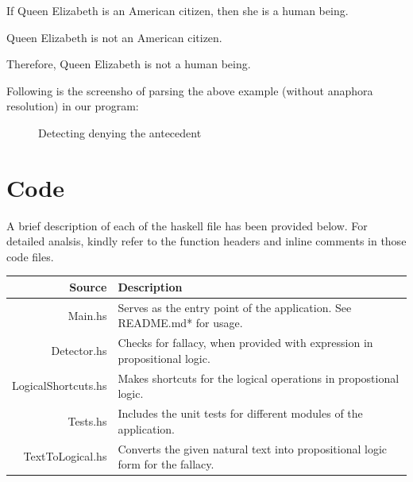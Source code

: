 \documentclass[14pt, english]{article}
\providecommand{\tabularnewline}{\\}
\begin{document}
\begin{center}
If Queen Elizabeth is an American citizen, then she is a human being.
\par\end{center}

\begin{center}
Queen Elizabeth is not an American citizen.
\par\end{center}

\begin{center}
Therefore, Queen Elizabeth is not a human being.
\par\end{center}

Following is the screensho of parsing the above example (without anaphora
resolution) in our program:

\begin{figure}[htp]
 \caption{Detecting denying the antecedent} \end{figure}


\section{Code}

A brief description of each of the haskell file has been provided
below. For detailed analsis, kindly refer to the function headers
and inline comments in those code files. 
\medskip{}


\begin{tabular}{rl}
Source & Description\tabularnewline
\hline 
Main.hs & Serves as the entry point of the application. See README.md{*} for
usage.\tabularnewline
Detector.hs & Checks for fallacy, when provided with expression in propositional
logic.\tabularnewline
LogicalShortcuts.hs & Makes shortcuts for the logical operations in propostional logic.\tabularnewline
Tests.hs & Includes the unit tests for different modules of the application.\tabularnewline
TextToLogical.hs & Converts the given natural text into propositional logic form for
the fallacy.\tabularnewline
\end{tabular}
\end{document}

